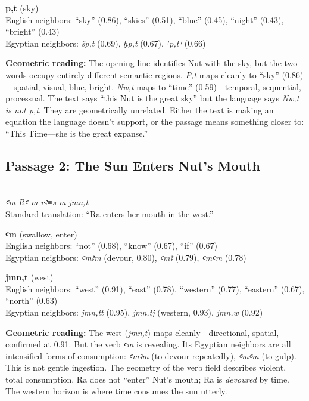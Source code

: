\documentclass[11pt, a4paper]{article}
\newcommand{\passagehiero}[1]{{\normalfont\hierofont\fontsize{14}{17}\selectfont #1}}
\begin{document}
\medskip

\noindent\textbf{p,t} (sky)\\
English neighbors: ``sky'' (0.86), ``skies'' (0.51), ``blue'' (0.45), ``night'' (0.43), ``bright'' (0.43)\\
Egyptian neighbors: \textit{šp,t} (0.69), \textit{ḥp,t} (0.67), \textit{⸢p,t⸣} (0.66)

\medskip

{\color{insight}\textbf{Geometric reading:}} The opening line identifies Nut with the sky, but the two words occupy entirely different semantic regions. \textit{P,t} maps cleanly to ``sky'' (0.86)---spatial, visual, blue, bright. \textit{Nw,t} maps to ``time'' (0.59)---temporal, sequential, processual. The text says ``this Nut is the great sky'' but the language says \textit{Nw,t is not p,t}. They are geometrically unrelated. Either the text is making an equation the language doesn't support, or the passage means something closer to: ``This Time---she is the great expanse.''

\subsection{Passage 2: The Sun Enters Nut's Mouth}

{\color{passage}\passagehiero{𓂝𓅓 𓇳𓏤 𓅓 𓂋𓄿𓊃 𓅓 𓇋𓅓𓈖𓏏}\\\medskip
\textit{\small ꜥm Rꜥ m rꜣ≡s m jmn,t}\\
Standard translation: ``Ra enters her mouth in the west.''}

\bigskip

\noindent\textbf{ꜥm} (swallow, enter)\\
English neighbors: ``not'' (0.68), ``know'' (0.67), ``if'' (0.67)\\
Egyptian neighbors: \textit{ꜥmꜣm} (devour, 0.80), \textit{ꜥmꜣ} (0.79), \textit{ꜥmꜥm} (0.78)

\medskip

\noindent\textbf{jmn,t} (west)\\
English neighbors: ``west'' (0.91), ``east'' (0.78), ``western'' (0.77), ``eastern'' (0.67), ``north'' (0.63)\\
Egyptian neighbors: \textit{jmn,tt} (0.95), \textit{jmn,tj} (western, 0.93), \textit{jmn,w} (0.92)

\medskip

{\color{insight}\textbf{Geometric reading:}} The west (\textit{jmn,t}) maps cleanly---directional, spatial, confirmed at 0.91. But the verb \textit{ꜥm} is revealing. Its Egyptian neighbors are all intensified forms of consumption: \textit{ꜥmꜣm} (to devour repeatedly), \textit{ꜥmꜥm} (to gulp). This is not gentle ingestion. The geometry of the verb field describes violent, total consumption. Ra does not ``enter'' Nut's mouth; Ra is \textit{devoured} by time. The western horizon is where time consumes the sun utterly.
\end{document}
